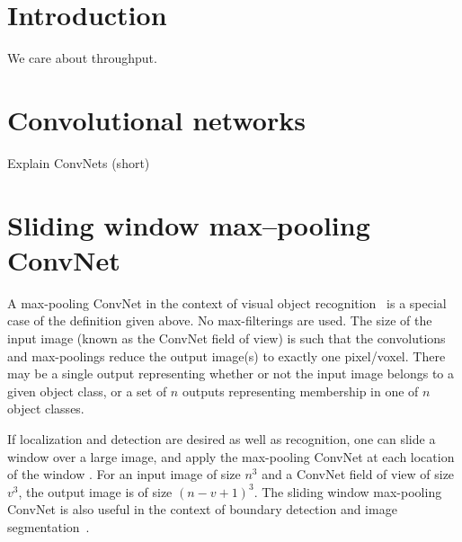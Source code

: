 \documentclass[conference]{IEEEtran}
\begin{document}

\section{Introduction}


We care about throughput.

\section{Convolutional networks}

Explain ConvNets (short)

\section{Sliding window max--pooling ConvNet}

  \label{sec:sliding-window}

  A max-pooling ConvNet in the context of visual object
  recognition~\cite{krizhevsky2012imagenet} is a special case of the
  definition given above.  No max-filterings are used.  The size of
  the input image (known as the ConvNet field of view) is such that
  the convolutions and max-poolings reduce the output image(s) to
  exactly one pixel/voxel.  There may be a single output representing
  whether or not the input image belongs to a given object class, or a
  set of $n$ outputs representing membership in one of $n$ object
  classes.

  If localization and detection are desired as well as recognition,
  one can slide a window over a large image, and apply the max-pooling
  ConvNet at each location of the window
  \cite{sermanet2013overfeat}. For an input image of size $n^3$ and a
  ConvNet field of view of size $v^3$, the output image is of size
  $(n-v+1)^3$.  The sliding window max-pooling ConvNet is also useful
  in the context of boundary detection and image
  segmentation~\cite{ciresan2012deep}.
\end{document}
